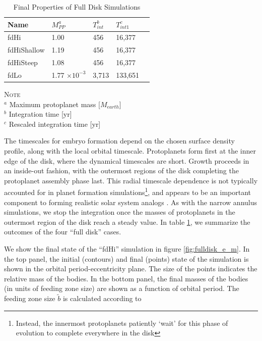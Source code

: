 \documentclass[twocolumn]{aastex63}
\begin{document}
\begin{table}
\caption{Final Properties of Full Disk Simulations}
\begin{tabular}{lllll} \hline \hline
Name     & $M_{PP}^a$ & $T_{int}^b$ & $T_{int 1}^c$ &  \\ \hline
fdHi                 &  1.00                                                         & 456                              & 16,377  &  \\
fdHiShallow    &  1.19                                                        & 456                              & 16,377  &  \\
fdHiSteep       &  1.08                                                         & 456                              & 16,377 &  \\
fdLo                &  1.77 $\times 10^{-3}$                                  & 3,713                              & 133,651 &  \\ \hline
\end{tabular}
\label{tab:sim_properties}
\begin{flushleft}
\textsc{Note} \\ {$^a$ Maximum protoplanet mass [$M_{earth}$] \\
		       $^b$ Integration time [yr] \\
		       $^c$ Rescaled integration time [yr]} \\
\end{flushleft}
\end{table}

The timescales for embryo formation depend on
the chosen surface density profile, along with the local orbital
timescale. Protoplanets form first at the inner edge of the disk,
where the dynamical timescales are short. Growth proceeds in an
inside-out fashion, with the outermost regions of the disk completing
the protoplanet assembly phase last. This radial timescale dependence is not typically
accounted for in planet formation simulations\footnote{Instead, the innermost protoplanets 
patiently `wait' for this phase of evolution to complete everywhere in the disk}, and appears to be an
important component to forming realistic solar system analogs
\citep{clement20}. As with the narrow annulus simulations, we stop the
integration once the masses of protoplanets in the outermost region of
the disk reach a steady value. In table \ref{tab:sim_properties}, we
summarize the outcomes of the four ``full disk'' cases.

We show the final state of the ``fdHi'' simulation in figure \ref{fig:fulldisk_e_m}. In the top panel,
the initial (contours) and final (points) state of the simulation is shown in the orbital period-eccentricity plane. The size of the points indicates the relative mass of the bodies. In the bottom panel, the final masses of the bodies (in units of feeding zone size) are shown as a function of orbital period. The feeding zone size $\tilde{b}$ is calculated according to
\end{document}

